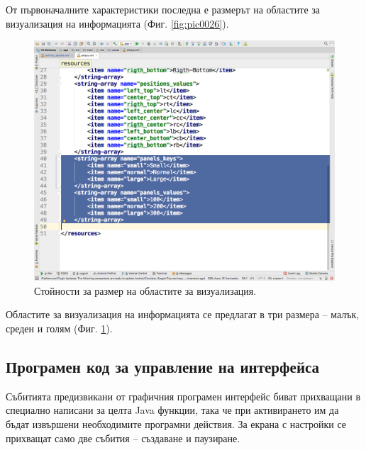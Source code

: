 \documentclass[book,14pt,oneside,openany]{memoir}
\begin{document}
От първоначалните характеристики последна е размерът на областите за визуализация на информацията (Фиг. \ref{fig:pic0026}). 

\begin{figure}[h]
  \centering
  \includegraphics[height=0.45\pdfpageheight]{./images/pic0027.png}
  \caption{Стойности за размер на областите за визуализация.}
\label{fig:pic0027}
\end{figure}
\FloatBarrier

Областите за визуализация на информацията се предлагат в три размера – малък, среден и голям (Фиг. \ref{fig:pic0027}).

\subsection{Програмен код за управление на интерфейса}

Събитията предизвикани от графичния програмен интерфейс биват прихващани в специално написани за целта Java функции, така че при активирането им да бъдат извършени необходимите програмни действия. За екрана с настройки се прихващат само две събития – създаване и паузиране. 
\end{document}
